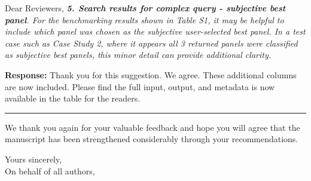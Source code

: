 \documentclass[12pt,a4paper]{letter}
\begin{document}
\begin{letter}{Dear Reviewers,}
\textit{\textbf{5. Search results for complex query - subjective best panel}.
For the benchmarking results shown in Table S1, it may be helpful to include which panel was chosen as the subjective user-selected best panel. In a test case such as Case Study 2, where it appears all 3 returned panels were classified as subjective best panels, this minor detail can provide additional clarity.}

\textbf{Response:} Thank you for this suggestion. We agree. These additional columns are now included. Please find the full input, output, and metadata is now available in the table for the readers. 

\noindent\rule{\textwidth}{0.4pt}

We thank you again for your valuable feedback and hope you will agree that the manuscript has been strengthened considerably through your recommendations.

\closing{Yours sincerely,\\
On behalf of all authors,}

\end{letter}
\end{document}
